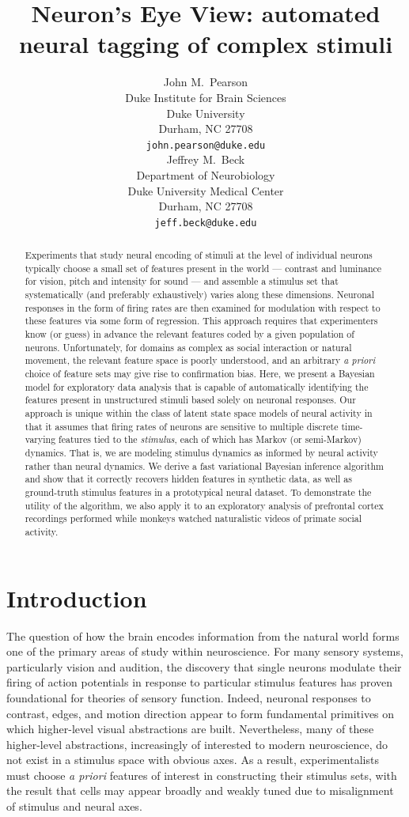 \documentclass{article} %
\title{Neuron's Eye View: automated neural tagging of complex stimuli}
\author{
John M.~Pearson\\
Duke Institute for Brain Sciences \\
Duke University\\
Durham, NC 27708 \\
\texttt{john.pearson@duke.edu} \\
\And
Jeffrey M.~Beck \\
Department of Neurobiology \\
Duke University Medical Center \\
Durham, NC 27708 \\
\texttt{jeff.beck@duke.edu} \\
}
\begin{document}
\maketitle

\begin{abstract}
Experiments that study neural encoding of stimuli at the level of individual neurons typically choose a small set of features present in the world --- contrast and luminance for vision, pitch and intensity for sound --- and assemble a stimulus set that systematically (and preferably exhaustively) varies along these dimensions. Neuronal responses in the form of firing rates are then examined for modulation with respect to these features via some form of regression. This approach requires that experimenters know (or guess) in advance the relevant features coded by a given population of neurons. Unfortunately, for domains as complex as social interaction or natural movement, the relevant feature space is poorly understood, and an arbitrary \emph{a priori} choice of feature sets may give rise to confirmation bias. Here, we present a Bayesian model for exploratory data analysis that is capable of automatically identifying the features present in unstructured stimuli based solely on neuronal responses. Our approach is unique within the class of latent state space models of neural activity in
that it assumes that firing rates of neurons are sensitive to multiple discrete time-varying features tied to the \emph{stimulus}, each of which has Markov (or semi-Markov) dynamics. That is, we are modeling stimulus dynamics as informed by neural activity rather than neural dynamics.  We derive a fast variational Bayesian inference algorithm and show that it correctly recovers hidden features in synthetic data, as well as ground-truth stimulus features in a prototypical neural dataset. To demonstrate the utility of the algorithm, we also apply it to an exploratory analysis of prefrontal cortex recordings performed while monkeys watched naturalistic videos of primate social activity.
\end{abstract}

\section{Introduction}
The question of how the brain encodes information from the natural world forms one of the primary areas of study within neuroscience. For many sensory systems, particularly vision and audition, the discovery that single neurons modulate their firing of action potentials in response to particular stimulus features has proven foundational for theories of sensory function. Indeed, neuronal responses to contrast, edges, and motion direction appear to form fundamental primitives on which higher-level visual abstractions are built. Nevertheless, many of these higher-level abstractions, increasingly of interested to modern neuroscience, do not exist in a stimulus space with obvious axes. As a result, experimentalists must choose \emph{a priori} features of interest in constructing their stimulus sets, with the result that cells may appear broadly and weakly tuned due to misalignment of stimulus and neural axes.
\end{document}
